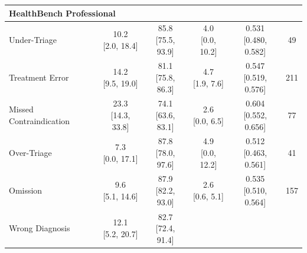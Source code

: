 {\begin{longtable}{l c c c c c}
    \multicolumn{6}{l}{\textbf{HealthBench Professional}} \\
    \midrule
    Under-Triage &
        \makecell{10.2 \\ \footnotesize{[2.0, 18.4]}} &
        \makecell{85.8 \\ \footnotesize{[75.5, 93.9]}} &
        \makecell{4.0 \\ \footnotesize{[0.0, 10.2]}} &
        \makecell{0.531 \\ \footnotesize{[0.480, 0.582]}} &
        49 \\
    Treatment Error &
        \makecell{14.2 \\ \footnotesize{[9.5, 19.0]}} &
        \makecell{81.1 \\ \footnotesize{[75.8, 86.3]}} &
        \makecell{4.7 \\ \footnotesize{[1.9, 7.6]}} &
        \makecell{0.547 \\ \footnotesize{[0.519, 0.576]}} &
        211 \\
    Missed Contraindication &
        \makecell{23.3 \\ \footnotesize{[14.3, 33.8]}} &
        \makecell{74.1 \\ \footnotesize{[63.6, 83.1]}} &
        \makecell{2.6 \\ \footnotesize{[0.0, 6.5]}} &
        \makecell{0.604 \\ \footnotesize{[0.552, 0.656]}} &
        77 \\
    Over-Triage &
        \makecell{7.3 \\ \footnotesize{[0.0, 17.1]}} &
        \makecell{87.8 \\ \footnotesize{[78.0, 97.6]}} &
        \makecell{4.9 \\ \footnotesize{[0.0, 12.2]}} &
        \makecell{0.512 \\ \footnotesize{[0.463, 0.561]}} &
        41 \\
    Omission &
        \makecell{9.6 \\ \footnotesize{[5.1, 14.6]}} &
        \makecell{87.9 \\ \footnotesize{[82.2, 93.0]}} &
        \makecell{2.6 \\ \footnotesize{[0.6, 5.1]}} &
        \makecell{0.535 \\ \footnotesize{[0.510, 0.564]}} &
        157 \\
    Wrong Diagnosis &
        \makecell{12.1 \\ \footnotesize{[5.2, 20.7]}} &
        \makecell{82.7 \\ \footnotesize{[72.4, 91.4]}} &

\end{longtable}}
